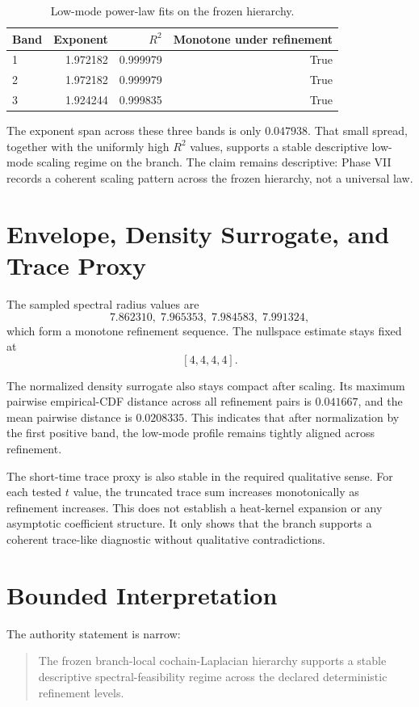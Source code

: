 \documentclass[11pt]{article}
\begin{document}
\begin{table}[t]
\centering
\small
\begin{tabular}{@{}lrrr@{}}
\toprule
Band & Exponent & $R^2$ & Monotone under refinement \\
\midrule
1 & 1.972182 & 0.999979 & True \\
2 & 1.972182 & 0.999979 & True \\
3 & 1.924244 & 0.999835 & True \\
\bottomrule
\end{tabular}
\caption{Low-mode power-law fits on the frozen hierarchy.}
\label{tab:fits}
\end{table}

The exponent span across these three bands is only $0.047938$. That small spread, together with the uniformly high $R^2$ values, supports a stable descriptive low-mode scaling regime on the branch. The claim remains descriptive: Phase VII records a coherent scaling pattern across the frozen hierarchy, not a universal law.

\section{Envelope, Density Surrogate, and Trace Proxy}

The sampled spectral radius values are
\[
7.862310,\;
7.965353,\;
7.984583,\;
7.991324 ,
\]
which form a monotone refinement sequence. The nullspace estimate stays fixed at
\[
[4,4,4,4].
\]

The normalized density surrogate also stays compact after scaling. Its maximum pairwise empirical-CDF distance across all refinement pairs is $0.041667$, and the mean pairwise distance is $0.0208335$. This indicates that after normalization by the first positive band, the low-mode profile remains tightly aligned across refinement.

The short-time trace proxy is also stable in the required qualitative sense. For each tested $t$ value, the truncated trace sum increases monotonically as refinement increases. This does not establish a heat-kernel expansion or any asymptotic coefficient structure. It only shows that the branch supports a coherent trace-like diagnostic without qualitative contradictions.

\section{Bounded Interpretation}

The authority statement is narrow:
\begin{quote}
The frozen branch-local cochain-Laplacian hierarchy supports a stable descriptive spectral-feasibility regime across the declared deterministic refinement levels.
\end{quote}
\end{document}
